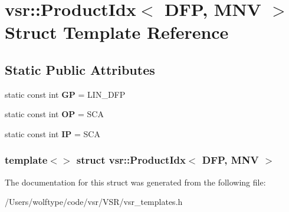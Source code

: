 \hypertarget{structvsr_1_1_product_idx_3_01_d_f_p_00_01_m_n_v_01_4}{\section{vsr\-:\-:Product\-Idx$<$ D\-F\-P, M\-N\-V $>$ Struct Template Reference}
\label{structvsr_1_1_product_idx_3_01_d_f_p_00_01_m_n_v_01_4}
}
\subsection*{Static Public Attributes}
\begin{DoxyCompactItemize}
\item 
\hypertarget{structvsr_1_1_product_idx_3_01_d_f_p_00_01_m_n_v_01_4_abeb7134f4423aec346d9976ef6a7f657}{static const int {\bfseries G\-P} = L\-I\-N\-\_\-\-D\-F\-P}\label{structvsr_1_1_product_idx_3_01_d_f_p_00_01_m_n_v_01_4_abeb7134f4423aec346d9976ef6a7f657}

\item 
\hypertarget{structvsr_1_1_product_idx_3_01_d_f_p_00_01_m_n_v_01_4_aa6d52417e3c785f6ec4a0bca7645da56}{static const int {\bfseries O\-P} = S\-C\-A}\label{structvsr_1_1_product_idx_3_01_d_f_p_00_01_m_n_v_01_4_aa6d52417e3c785f6ec4a0bca7645da56}

\item 
\hypertarget{structvsr_1_1_product_idx_3_01_d_f_p_00_01_m_n_v_01_4_ae4c39af8b6d8cf7de015fc07ad0e9ce6}{static const int {\bfseries I\-P} = S\-C\-A}\label{structvsr_1_1_product_idx_3_01_d_f_p_00_01_m_n_v_01_4_ae4c39af8b6d8cf7de015fc07ad0e9ce6}

\end{DoxyCompactItemize}
\subsubsection*{template$<$$>$ struct vsr\-::\-Product\-Idx$<$ D\-F\-P, M\-N\-V $>$}



The documentation for this struct was generated from the following file\-:\begin{DoxyCompactItemize}
\item 
/\-Users/wolftype/code/vsr/\-V\-S\-R/vsr\-\_\-templates.\-h\end{DoxyCompactItemize}
